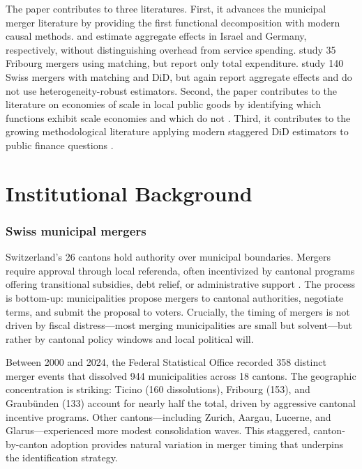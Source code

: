 \documentclass[12pt]{article}
\begin{document}
The paper contributes to three literatures. First, it advances the municipal merger literature by providing the first functional decomposition with modern causal methods. \citet{reingewertz2012} and \citet{blesse2019} estimate aggregate effects in Israel and Germany, respectively, without distinguishing overhead from service spending. \citet{steiner2017} study 35 Fribourg mergers using matching, but report only total expenditure. \citet{zell2025} study 140 Swiss mergers with matching and DiD, but again report aggregate effects and do not use heterogeneity-robust estimators. Second, the paper contributes to the literature on economies of scale in local public goods by identifying which functions exhibit scale economies and which do not \citep{byrnes2007, holzer2009}. Third, it contributes to the growing methodological literature applying modern staggered DiD estimators to public finance questions \citep{baker2022}.

\section{Institutional Background}

\subsubsection*{Swiss municipal mergers} Switzerland's 26 cantons hold authority over municipal boundaries. Mergers require approval through local referenda, often incentivized by cantonal programs offering transitional subsidies, debt relief, or administrative support \citep{steiner2017}. The process is bottom-up: municipalities propose mergers to cantonal authorities, negotiate terms, and submit the proposal to voters. Crucially, the timing of mergers is not driven by fiscal distress---most merging municipalities are small but solvent---but rather by cantonal policy windows and local political will.

Between 2000 and 2024, the Federal Statistical Office recorded 358 distinct merger events that dissolved 944 municipalities across 18 cantons. The geographic concentration is striking: Ticino (160 dissolutions), Fribourg (153), and Graubünden (133) account for nearly half the total, driven by aggressive cantonal incentive programs. Other cantons---including Zurich, Aargau, Lucerne, and Glarus---experienced more modest consolidation waves. This staggered, canton-by-canton adoption provides natural variation in merger timing that underpins the identification strategy.
\end{document}

